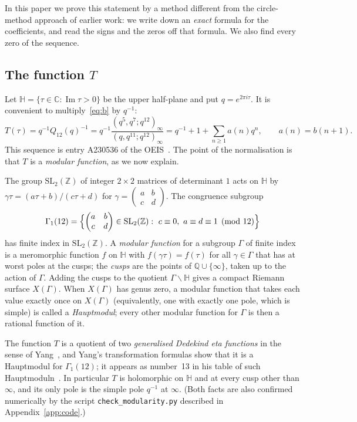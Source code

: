 \documentclass[11pt]{amsart}
\numberwithin{equation}{section}
\theoremstyle{definition}
\theoremstyle{remark}
\newcommand{\SL}{\mathrm{SL}}
\newcommand{\Z}{\mathbb{Z}}
\begin{document}
In this paper we prove this statement by a method different from the circle-method approach of earlier work: we write down an \emph{exact} formula for the coefficients, and read the signs and the zeros off that formula. We also find every zero of the sequence.

\subsection{The function \texorpdfstring{$T$}{T}}
Let $\mathbb H=\{\tau\in\mathbb C:\operatorname{Im}\tau>0\}$ be the upper half-plane and put $q=e^{2\pi i\tau}$. It is convenient to multiply~\eqref{eq:b} by $q^{-1}$:
\begin{equation}\label{eq:T}
T(\tau)=q^{-1}Q_{12}(q)^{-1}=q^{-1}\frac{(q^5,q^7;q^{12})_\infty}{(q,q^{11};q^{12})_\infty}
=q^{-1}+1+\sum_{n\ge1}a(n)q^n,\qquad a(n)=b(n+1).
\end{equation}
This sequence is entry A230536 of the OEIS~\cite{OEIS}. The point of the normalisation is that $T$ is a \emph{modular function}, as we now explain.

The group $\SL_2(\Z)$ of integer $2\times2$ matrices of determinant $1$ acts on $\mathbb H$ by $\gamma\tau=(a\tau+b)/(c\tau+d)$ for $\gamma=\left(\begin{smallmatrix}a&b\\c&d\end{smallmatrix}\right)$. The congruence subgroup
\[
\Gamma_1(12)=\Bigl\{\begin{pmatrix}a&b\\c&d\end{pmatrix}\in\SL_2(\Z):\ c\equiv0,\ a\equiv d\equiv1\pmod{12}\Bigr\}
\]
has finite index in $\SL_2(\Z)$. A \emph{modular function} for a subgroup $\Gamma$ of finite index is a meromorphic function $f$ on $\mathbb H$ with $f(\gamma\tau)=f(\tau)$ for all $\gamma\in\Gamma$ that has at worst poles at the cusps; the \emph{cusps} are the points of $\mathbb{Q}\cup\{\infty\}$, taken up to the action of $\Gamma$. Adding the cusps to the quotient $\Gamma\backslash\mathbb H$ gives a compact Riemann surface $X(\Gamma)$. When $X(\Gamma)$ has genus zero, a modular function that takes each value exactly once on $X(\Gamma)$ (equivalently, one with exactly one pole, which is simple) is called a \emph{Hauptmodul}; every other modular function for $\Gamma$ is then a rational function of it.

The function $T$ is a quotient of two \emph{generalised Dedekind eta functions} in the sense of Yang~\cite{Yang}, and Yang's transformation formulas show that it is a Hauptmodul for $\Gamma_1(12)$; it appears as number~13 in his table of such Hauptmoduln~\cite[Table~1]{Yang}. In particular $T$ is holomorphic on $\mathbb H$ and at every cusp other than $\infty$, and its only pole is the simple pole $q^{-1}$ at $\infty$. (Both facts are also confirmed numerically by the script \texttt{check\_modularity.py} described in Appendix~\ref{app:code}.)
\end{document}
